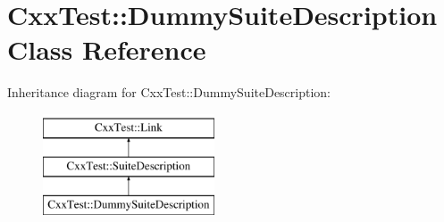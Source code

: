 \hypertarget{classCxxTest_1_1DummySuiteDescription}{\section{Cxx\-Test\-:\-:Dummy\-Suite\-Description Class Reference}
\label{classCxxTest_1_1DummySuiteDescription}
}
Inheritance diagram for Cxx\-Test\-:\-:Dummy\-Suite\-Description\-:\begin{figure}[H]
\begin{center}
\leavevmode
\includegraphics[height=3.000000cm]{classCxxTest_1_1DummySuiteDescription}
\end{center}
\end{figure}
